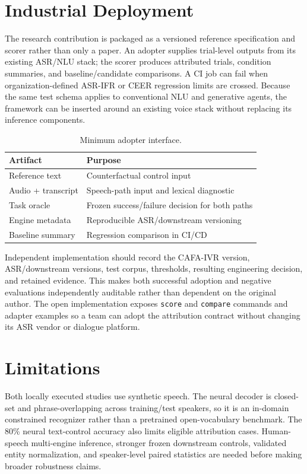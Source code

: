 \documentclass[9pt,twocolumn]{extarticle}
\begin{document}
\section{Industrial Deployment}
The research contribution is packaged as a versioned reference specification and scorer rather than only a paper. An adopter supplies trial-level outputs from its existing ASR/NLU stack; the scorer produces attributed trials, condition summaries, and baseline/candidate comparisons. A CI job can fail when organization-defined ASR-IFR or CEER regression limits are crossed. Because the same test schema applies to conventional NLU and generative agents, the framework can be inserted around an existing voice stack without replacing its inference components.

\begin{table}[t]
\caption{Minimum adopter interface.}
\label{tab:adopt}
\centering\scriptsize
\begin{tabular}{p{}p{}}
\toprule
Artifact & Purpose\\
\midrule
Reference text & Counterfactual control input\\
Audio + transcript & Speech-path input and lexical diagnostic\\
Task oracle & Frozen success/failure decision for both paths\\
Engine metadata & Reproducible ASR/downstream versioning\\
Baseline summary & Regression comparison in CI/CD\\
\bottomrule
\end{tabular}
\end{table}

Independent implementation should record the CAFA-IVR version, ASR/downstream versions, test corpus, thresholds, resulting engineering decision, and retained evidence. This makes both successful adoption and negative evaluations independently auditable rather than dependent on the original author. The open implementation exposes \texttt{score} and \texttt{compare} commands and adapter examples so a team can adopt the attribution contract without changing its ASR vendor or dialogue platform.

\section{Limitations}
Both locally executed studies use synthetic speech. The neural decoder is closed-set and phrase-overlapping across training/test speakers, so it is an in-domain constrained recognizer rather than a pretrained open-vocabulary benchmark. The 80\% neural text-control accuracy also limits eligible attribution cases. Human-speech multi-engine inference, stronger frozen downstream controls, validated entity normalization, and speaker-level paired statistics are needed before making broader robustness claims.
\end{document}
